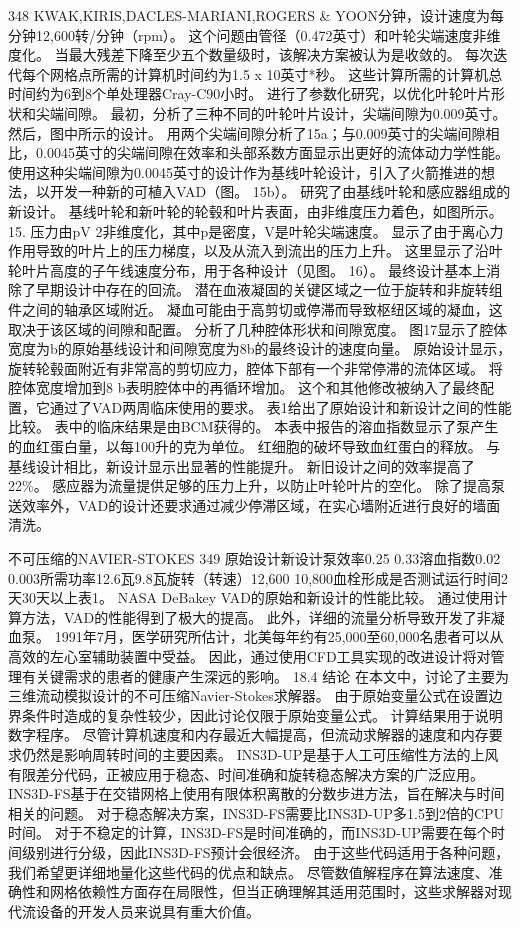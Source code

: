 \documentclass[UTF8,11pt,a4paper,openany,fontset=fandol]{ctexbook}
\begin{document}
348 KWAK,KIRIS,DACLES-MARIANI,ROGERS \& YOON分钟，设计速度为每分钟12,600转/分钟（rpm）。 这个问题由管径（0.472英寸）和叶轮尖端速度非维度化。 当最大残差下降至少五个数量级时，该解决方案被认为是收敛的。 每次迭代每个网格点所需的计算机时间约为1.5 x 10英寸*秒。 这些计算所需的计算机总时间约为6到8个单处理器Cray-C90小时。 进行了参数化研究，以优化叶轮叶片形状和尖端间隙。 最初，分析了三种不同的叶轮叶片设计，尖端间隙为0.009英寸。 然后，图中所示的设计。 用两个尖端间隙分析了15a；与0.009英寸的尖端间隙相比，0.0045英寸的尖端间隙在效率和头部系数方面显示出更好的流体动力学性能。 使用这种尖端间隙为0.0045英寸的设计作为基线叶轮设计，引入了火箭推进的想法，以开发一种新的可植入VAD（图。 15b）。 研究了由基线叶轮和感应器组成的新设计。 基线叶轮和新叶轮的轮毂和叶片表面，由非维度压力着色，如图所示。 15. 压力由pV 2非维度化，其中p是密度，V是叶轮尖端速度。 显示了由于离心力作用导致的叶片上的压力梯度，以及从流入到流出的压力上升。 这里显示了沿叶轮叶片高度的子午线速度分布，用于各种设计（见图。 16）。 最终设计基本上消除了早期设计中存在的回流。 潜在血液凝固的关键区域之一位于旋转和非旋转组件之间的轴承区域附近。 凝血可能由于高剪切或停滞而导致枢纽区域的凝血，这取决于该区域的间隙和配置。 分析了几种腔体形状和间隙宽度。 图17显示了腔体宽度为b的原始基线设计和间隙宽度为8b的最终设计的速度向量。 原始设计显示，旋转轮毂面附近有非常高的剪切应力，腔体下部有一个非常停滞的流体区域。 将腔体宽度增加到8 b表明腔体中的再循环增加。 这个和其他修改被纳入了最终配置，它通过了VAD两周临床使用的要求。 表1给出了原始设计和新设计之间的性能比较。 表中的临床结果是由BCM获得的。 本表中报告的溶血指数显示了泵产生的血红蛋白量，以每100升的克为单位。 红细胞的破坏导致血红蛋白的释放。 与基线设计相比，新设计显示出显著的性能提升。 新旧设计之间的效率提高了22\%。 感应器为流量提供足够的压力上升，以防止叶轮叶片的空化。 除了提高泵送效率外，VAD的设计还要求通过减少停滞区域，在实心墙附近进行良好的墙面清洗。

不可压缩的NAVIER-STOKES 349 原始设计新设计泵效率0.25 0.33溶血指数0.02 0.003所需功率12.6瓦9.8瓦旋转（转速）12,600 10,800血栓形成是否测试运行时间2天30天以上表1。 NASA DeBakey VAD的原始和新设计的性能比较。 通过使用计算方法，VAD的性能得到了极大的提高。 此外，详细的流量分析导致开发了非凝血泵。 1991年7月，医学研究所估计，北美每年约有25,000至60,000名患者可以从高效的左心室辅助装置中受益。 因此，通过使用CFD工具实现的改进设计将对管理有关键需求的患者的健康产生深远的影响。 18.4 结论 在本文中，讨论了主要为三维流动模拟设计的不可压缩Navier-Stokes求解器。 由于原始变量公式在设置边界条件时造成的复杂性较少，因此讨论仅限于原始变量公式。 计算结果用于说明数字程序。 尽管计算机速度和内存最近大幅提高，但流动求解器的速度和内存要求仍然是影响周转时间的主要因素。 INS3D-UP是基于人工可压缩性方法的上风有限差分代码，正被应用于稳态、时间准确和旋转稳态解决方案的广泛应用。 INS3D-FS基于在交错网格上使用有限体积离散的分数步进方法，旨在解决与时间相关的问题。 对于稳态解决方案，INS3D-FS需要比INS3D-UP多1.5到2倍的CPU时间。 对于不稳定的计算，INS3D-FS是时间准确的，而INS3D-UP需要在每个时间级别进行分级，因此INS3D-FS预计会很经济。 由于这些代码适用于各种问题，我们希望更详细地量化这些代码的优点和缺点。 尽管数值解程序在算法速度、准确性和网格依赖性方面存在局限性，但当正确理解其适用范围时，这些求解器对现代流设备的开发人员来说具有重大价值。
\end{document}
